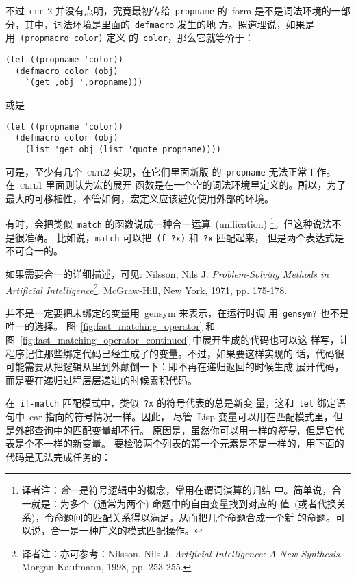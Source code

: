 \begin{notes}
不过~\textsc{cltl}2 并没有点明，究竟最初传给~\texttt{propname} 的~form
是不是词法环境的一部分，其中，词法环境是里面的~\texttt{defmacro} 发生的地
方。照道理说，如果是用~\texttt{(propmacro color)} 定义
的~\texttt{color}，那么它就等价于：

\begin{verbatim}
(let ((propname 'color))
  (defmacro color (obj)
    `(get ,obj ',propname)))
\end{verbatim}
或是
\begin{verbatim}
(let ((propname 'color))
  (defmacro color (obj)
    (list 'get obj (list 'quote propname))))
\end{verbatim}

可是，至少有几个~\textsc{cltl2} 实现，在它们里面新版
的~\texttt{propname} 无法正常工作。在~\textsc{cltl}1 里面则认为宏的展开
函数是在一个空的词法环境里定义的。所以，为了
最大的可移植性，不管如何，宏定义应该避免使用外部的环境。


有时，会把类似~\texttt{match} 的函数说成一种合一运算~(unification)
\footnote{译者注：\emph{合一}是符号逻辑中的概念，常用在谓词演算的归结
中。简单说，合一就是：为多个~(通常为两个) 命题中的自由变量找到对应的
值~(或者代换关系)，令命题间的匹配关系得以满足，从而把几个命题合成一个新
的命题。可以说，合一是一种广义的模式匹配操作。}。但这种说法不是很准确。
比如说，\texttt{match} 可以把~\texttt{(f ?x)} 和~\texttt{?x} 匹配起来，
但是两个表达式是不可合一的。

如果需要合一的详细描述，可见: Nilsson, Nils J. \emph{Problem-Solving
Methods in Artificial Intelligence}\footnote{译者注：亦可参考：Nilsson, Nils J. 
\emph{Artificial Intelligence: A New Synthesis}. Morgan Kaufmann, 1998, pp. 253-255. }. McGraw-Hill,
New York, 1971, pp. 175-178.


并不是一定要把未绑定的变量用~gensym 来表示，在运行时调
用~\texttt{gensym?} 也不是唯一的选择。
图~\ref{fig:fast_matching_operator} 和
图~\ref{fig:fast_matching_operator_continued} 中展开生成的代码也可以这
样写，让程序记住那些绑定代码已经生成了的变量。不过，如果要这样实现的
话，代码很可能需要从把逻辑从里到外颠倒一下：即不再在递归返回的时候生成
展开代码，而是要在递归过程层层递进的时候累积代码。


在~\texttt{if-match} 匹配模式中，类似~\texttt{?x} 的符号代表的总是新变
量，这和~\texttt{let} 绑定语句中~car 指向的符号情况一样。因此，
尽管~Lisp 变量可以用在匹配模式里，但是外部查询中的匹配变量却不行。
原因是，虽然你可以用一样的\emph{符号}，但是它代表是个不一样的新变量。
要检验两个列表的第一个元素是不是一样的，用下面的代码是无法完成任务的：
   

\end{notes}
